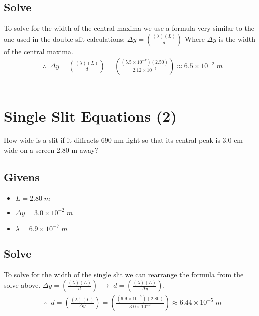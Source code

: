\documentclass{article}
\begin{document}
\subsection*{Solve}
To solve for the width of the central maxima we use a formula very similar to the one used in the double slit calculations: $\Delta y = \left(\frac{(\lambda)(L)}{d}\right)$ Where $\Delta y$ is the width of the central maxima.\\
\begin{align*}
     & \therefore\;\;\Delta y = \left(\frac{(\lambda)(L)}{d}\right) = \left(\frac{(5.5 \times 10^{-7})(2.50)}{2.12 \times 10^{-5}}\right) \approx 6.5 \times 10^{-2}\;m
\end{align*}\leavevmode\\

\section{Single Slit Equations (2)}
How wide is a slit if it diffracts 690 nm light so that its central peak is 3.0 cm wide on a screen 2.80 m away?
\subsection*{Givens}
\begin{itemize}
    \item $L = 2.80\;m$
    \item $ \Delta y = 3.0 \times 10^{-2}\;m$
    \item $\lambda = 6.9 \times 10^{-7}\;m$
\end{itemize}\leavevmode
\subsection*{Solve}
To solve for the width of the single slit we can rearrange the formula from the solve above. $\Delta y = \left(\frac{(\lambda)(L)}{d}\right)$ $\to$ $d = \left(\frac{(\lambda)(L)}{\Delta y}\right)$.\\
\begin{align*}
     & \therefore\;\;d = \left(\frac{(\lambda)(L)}{\Delta y}\right) = \left(\frac{(6.9 \times 10^{-7})(2.80)}{3.0 \times 10^{-2}}\right) \approx 6.44 \times 10^{-5}\;m
\end{align*}\leavevmode\\
\end{document}
